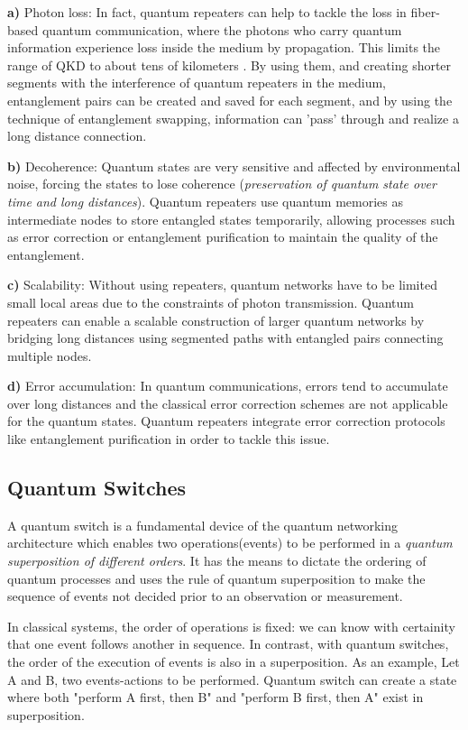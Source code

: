 \documentclass[12pt]{ieeetj}
\begin{document}
		\textbf{a)} Photon loss:
		In fact, quantum repeaters can help to tackle the loss in fiber-based quantum communication,
		where the photons who carry quantum information experience loss inside the medium by propagation. 
		This limits the range of QKD to about tens of kilometers \cite{repeater1}. 
		By using them, and creating shorter segments with the interference of quantum repeaters in the medium,
		entanglement pairs can be created and saved for each segment, 
		and by using the technique of entanglement swapping, information can 'pass' through and realize a long distance connection.

		\textbf{b)} Decoherence:
		Quantum states are very sensitive and affected by environmental noise, forcing the states to lose coherence (\textit{preservation of quantum
		state over time and long distances}).
		Quantum repeaters use quantum memories\cite{memories} as intermediate nodes to store entangled states 
		temporarily, allowing processes such as error correction or entanglement purification to maintain 
		the quality of the entanglement.
		
		\textbf{c)} Scalability:
		Without using repeaters, quantum networks have to be limited small local areas due to the
		constraints of photon transmission.
		Quantum repeaters can enable a scalable construction 
		of larger quantum networks by bridging long distances using segmented 
		paths with entangled pairs connecting multiple nodes.
		
		\textbf{d)} Error accumulation:
		In quantum communications, errors tend to accumulate over long distances
		and the classical error correction schemes are not applicable for the quantum states.
		Quantum repeaters integrate error correction protocols like entanglement purification
		in order to tackle this issue.

		\subsection{Quantum Switches}
		
		A quantum switch is a fundamental device of the quantum networking 
		architecture which
		enables two operations(events) to be performed in a \textit{quantum superposition of different orders}. 
		It has the means to dictate the ordering of quantum processes and
		uses the rule of quantum superposition to make the sequence of events not decided 
		prior to an observation or measurement.

		In classical systems, the order of operations is fixed: we can know with certainity that one event follows another in sequence. 
		In contrast, with quantum switches, the order of the execution of events is also in a superposition.
		As an example,
		Let A and B, two events-actions to be performed. Quantum switch can create a state where both "perform A first, then B"
		and "perform B first, then A" exist in superposition.
\end{document}
